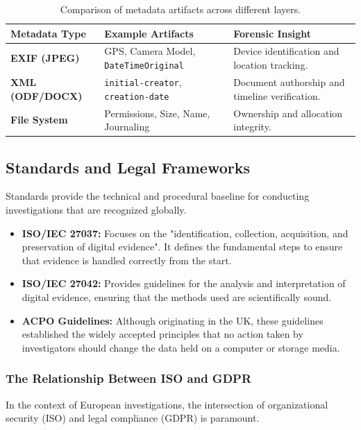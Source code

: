 \begin{table}[H]
\centering
\small
\begin{tabular}{|p{3cm}|p{4cm}|p{3.5cm}|}
\hline
\textbf{Metadata Type} & \textbf{Example Artifacts} & \textbf{Forensic Insight} \\
\hline
\textbf{EXIF (JPEG)} & GPS, Camera Model, \texttt{DateTimeOriginal} & Device identification and location tracking. \\
\hline
\textbf{XML (ODF/DOCX)} & \texttt{initial-creator}, \texttt{creation-date} & Document authorship and timeline verification. \\
\hline
\textbf{File System} & Permissions, Size, Name, Journaling & Ownership and allocation integrity. \\
\hline
\end{tabular}
\caption{Comparison of metadata artifacts across different layers.}
\end{table}


\subsection{Standards and Legal Frameworks}

Standards provide the technical and procedural baseline for conducting investigations that are recognized globally.

\begin{itemize}
    \item \textbf{ISO/IEC 27037:} Focuses on the "identification, collection, acquisition, and preservation of digital evidence". It defines the fundamental steps to ensure that evidence is handled correctly from the start.
    \item \textbf{ISO/IEC 27042:} Provides guidelines for the analysis and interpretation of digital evidence, ensuring that the methods used are scientifically sound.
    \item \textbf{ACPO Guidelines:} Although originating in the UK, these guidelines established the widely accepted principles that no action taken by investigators should change the data held on a computer or storage media.
\end{itemize}

\subsubsection*{The Relationship Between ISO and GDPR}
In the context of European investigations, the intersection of organizational security (ISO) and legal compliance (GDPR) is paramount.


